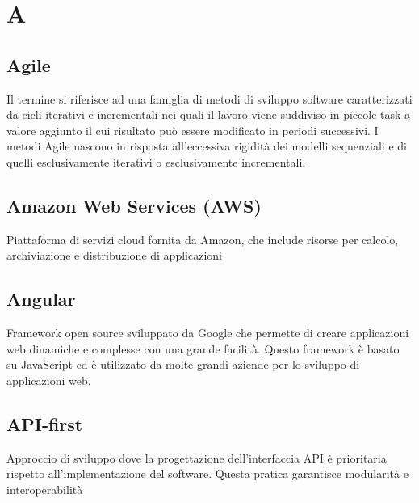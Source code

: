 \documentclass[10pt, letterpaper]{article}
\begin{document}
\makeTitlePage

\makeChangelog

\newpage

\tableofcontents

\newpage

\setcounter{secnumdepth}{0}
\setcounter{tocdepth}{2}


\section{A}

\subsection*{Agile}
Il termine si riferisce ad una famiglia di metodi di sviluppo software caratterizzati da cicli iterativi e incrementali nei quali
il lavoro viene suddiviso in piccole task a valore aggiunto il cui risultato può essere modificato in periodi successivi. I metodi Agile
nascono in risposta all'eccessiva rigidità dei modelli sequenziali e di quelli esclusivamente iterativi o esclusivamente incrementali.

\subsection*{Amazon Web Services (AWS)}
Piattaforma di servizi cloud fornita da Amazon, che include risorse per calcolo, archiviazione e distribuzione di applicazioni

\subsection*{Angular}
Framework open source sviluppato da Google che permette di creare applicazioni web dinamiche e complesse con una grande facilità. Questo framework
è basato su JavaScript ed è utilizzato da molte grandi aziende per lo sviluppo di applicazioni web.

\subsection*{API-first}
Approccio di sviluppo dove la progettazione dell'interfaccia API è prioritaria rispetto all'implementazione del software. Questa
pratica garantisce modularità e interoperabilità
\end{document}
